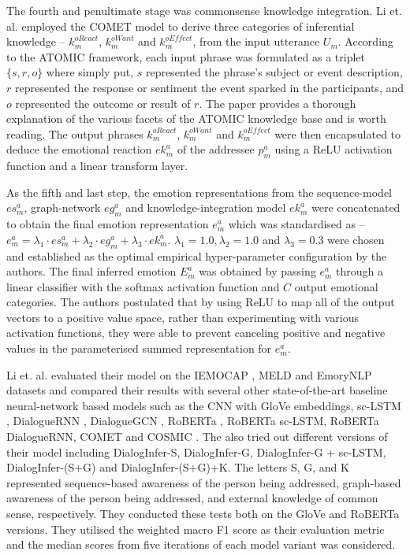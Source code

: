 The fourth and penultimate stage was commonsense knowledge integration. Li et. al. employed the COMET model to derive three categories of inferential knowledge -- $k^{oReact}_m$, $k^{oWant}_m$ and $k^\mathit{oEffect}_m$, from the input utterance $U_m$. According to the ATOMIC framework, each input phrase was formulated as a triplet $\{s, r, o\}$ where simply put, $s$ represented the phrase's subject or event description, $r$ represented the response or sentiment the event sparked in the participants, and $o$ represented the outcome or result of $r$. The paper provides a thorough explanation of the various facets of the ATOMIC knowledge base and is worth reading. The output phrases $k^{oReact}_m$, $k^{oWant}_m$ and $k^\mathit{oEffect}_m$ were then encapsulated to deduce the emotional reaction $ek^a_m$ of the addressee $p^a_m$ using a ReLU activation function and a linear transform layer.

As the fifth and last step, the emotion representations from the sequence-model $es^a_m$, graph-network $eg^a_m$ and knowledge-integration model $ek^a_m$ were concatenated to obtain the final emotion representation $e^a_m$ which was standardised as -- $e^a_m = \lambda_1 \cdot es^a_m + \lambda_2 \cdot eg^a_m + \lambda_3 \cdot ek^a_m$. $\lambda_1 = 1.0, \lambda_2 = 1.0$ and $\lambda_3 = 0.3$ were chosen and established as the optimal empirical hyper-parameter configuration by the authors. The final inferred emotion $E^a_m$ was obtained by passing $e^a_m$ through a linear classifier with the softmax activation function and $C$ output emotional categories. The authors postulated that by using ReLU to map all of the output vectors to a positive value space, rather than experimenting with various activation functions, they were able to prevent canceling positive and negative values in the parameterised summed representation for $e^a_m$.

Li et. al. evaluated their model on the IEMOCAP \cite{Busso2008IEMOCAPIE}, MELD \cite{Poria2018MELDAM} and EmoryNLP \cite{Zahiri2017EmotionDO} datasets and compared their results with several other state-of-the-art baseline neural-network based models such as the CNN \cite{Kim2014ConvolutionalNN} with GloVe embeddings, sc-LSTM \cite{poria-etal-2017-context}, DialogueRNN \cite{Majumder2018DialogueRNNAA}, DialogueGCN \cite{Ghosal2019DialogueGCNAG}, RoBERTa \cite{https://doi.org/10.48550/arxiv.1907.11692}, RoBERTa sc-LSTM, RoBERTa DialogueRNN, COMET \cite{bosselut-etal-2019-comet} and COSMIC \cite{Ghosal2020COSMICCK}. The also tried out different versions of their model including DialogInfer-S, DialogInfer-G, DialogInfer-G + sc-LSTM, DialogInfer-(S+G) and DialogInfer-(S+G)+K. The letters S, G, and K represented sequence-based awareness of the person being addressed, graph-based awareness of the person being addressed, and external knowledge of common sense, respectively. They conducted these tests both on the GloVe and RoBERTa versions. They utilised the weighted macro F1 score as their evaluation metric and the median scores from five iterations of each model variant was considered.

